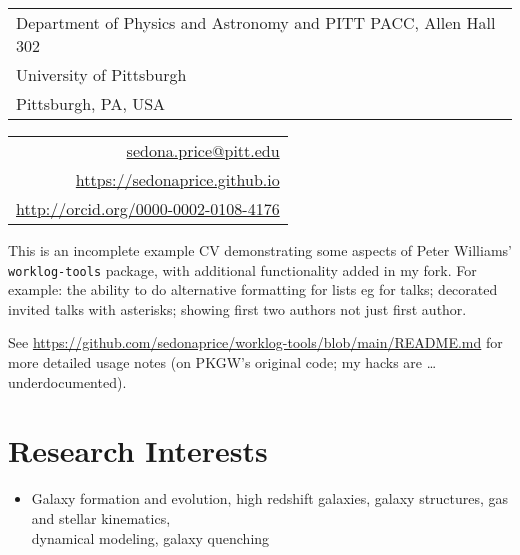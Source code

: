 \documentclass[line,10pt]{article}
\makeatletter
\def\sectionfont{\fontsize{11pt}{0pt}\bf}
\newlength{\mainindent} \setlength{\mainindent}{15pt}
\newcommand{\myemail}{sedona.price@pitt.edu}
\newcommand{\mypostlineone}{Department of Physics and Astronomy and PITT PACC, Allen Hall 302}
\newcommand{\mypostlinetwo}{University of Pittsburgh}
\newcommand{\mypostlinethree}{Pittsburgh, PA, USA}
\newcommand{\mysite}{https://sedonaprice.github.io}
\newcommand{\myorcid}{http://orcid.org/0000-0002-0108-4176}
\let\origsection\section
\renewcommand\section{\starsection}
\newcommand\starsection[1]
{\sectionprelude\origsection*{\sectionfont#1}\sectionpostlude}
\newcommand\sectionprelude{%
  \vspace{\sectionskip}
}
\newcommand\sectionpostlude{%
  \vspace{\sectionafterskip}
}
\makeatother
\begin{document}
\begin{minipage}{\textwidth}
  \vglue -10pt
  \hspace{-8.5pt}
    \begin{tabular}{l}    
        \mypostlineone\\
        \mypostlinetwo\\
        \mypostlinethree
    \end{tabular}
    \hfill \hspace{12pt} 
    \begin{tabular}{r}
        \href{mailto:\myemail}{\myemail}\\
        \url{\mysite}\\
        \url{\myorcid}
    \end{tabular}
  \end{minipage}



\thispagestyle{firststyle}


\vspace{12pt}

This is an incomplete example CV demonstrating some aspects of 
Peter Williams' \texttt{worklog-tools} package, with 
additional functionality added in my fork.
For example: 
the ability to do alternative formatting for lists eg for talks; 
decorated invited talks with asterisks; showing first two authors not just 
first author.  


\vspace{2pt} 
See \url{https://github.com/sedonaprice/worklog-tools/blob/main/README.md} 
for more detailed usage notes (on PKGW's original code; my hacks are \ldots
underdocumented).

\section{Research Interests}

\begin{itemize}[label={}, leftmargin=\mainindent]
  \item Galaxy formation and evolution,  high redshift galaxies, galaxy structures,  
  gas and stellar kinematics, \\
  dynamical modeling, galaxy quenching
\end{itemize}
\end{document}
